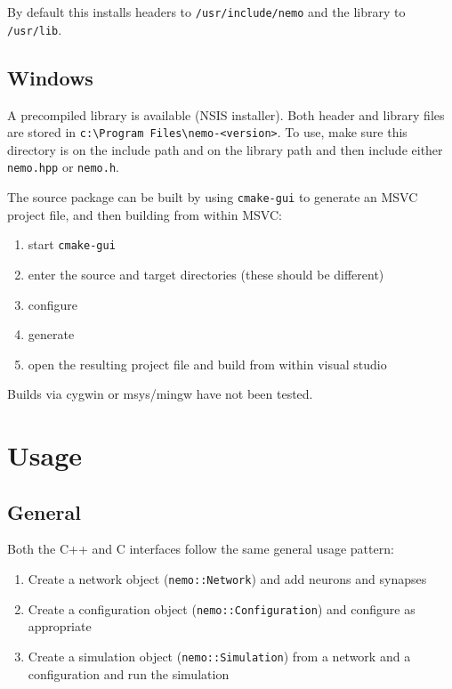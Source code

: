 \documentclass[a4paper]{article}
\newcommand{\code}[1]{\texttt{#1}}
\newcommand{\command}[1]{\texttt{#1}}
\newcommand{\file}[1]{\texttt{#1}}
\newcommand{\directory}[1]{\texttt{#1}}
\begin{document}
By default this installs headers to \directory{/usr/include/nemo} and the
library to \directory{/usr/lib}. 

\subsection{Windows}

A precompiled library is available (NSIS installer).
Both header and library files are stored in \directory{c:\textbackslash Program Files\textbackslash nemo-<version>}.
To use, make sure this directory is on the include path and on the library path
and then include either \file{nemo.hpp} or \file{nemo.h}.

The source package can be built by using \command{cmake-gui} to generate an MSVC project file,
	and then building from within MSVC:

\begin{enumerate}
	\item start \command{cmake-gui}
	\item enter the source and target directories (these should be different)
	\item configure
	\item generate
	\item open the resulting project file and build from within visual studio
\end{enumerate}

Builds via cygwin or msys/mingw have not been tested.

\section{Usage}

\subsection{General}

Both the C++ and C interfaces follow the same general usage pattern:

\begin{enumerate}
	\item Create a network object (\code{nemo::Network}) and add neurons and synapses
	\item Create a configuration object (\code{nemo::Configuration}) and configure as appropriate
	\item Create a simulation object (\code{nemo::Simulation}) from a network and a configuration and run the simulation
\end{enumerate}
\end{document}
